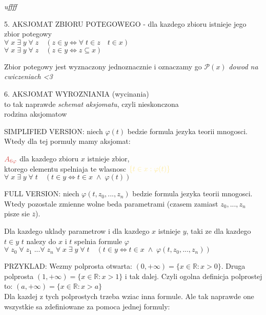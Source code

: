 \documentclass{article}
\newcommand{\R}{\mathbb{R}}
\newcommand{\Po}{\mathcal{P}}
\begin{document}
  \emph{uffff}\bigskip
  \begin{center}
    \color{tit}5. AKSJOMAT ZBIORU POTEGOWEGO \color{txt}- dla kazdego zbioru istnieje jego zbior potegowy\smallskip\\
    $\forall\;x\;\exists\;y\;\forall\;z\quad (z\in y\iff\forall\;t\in z\quad t\in x)$\smallskip\\
    $\forall\;x\;\exists\;y\;\forall\;z\quad (z\in y\iff z\subseteq x)$
  \end{center}
  Zbior potegowy jest wyznaczony jednoznacznie i oznaczamy go $\Po(x)$ \emph{\color{emp}dowod na cwiczeniach <3}\bigskip
  \begin{center}
    \color{tit}6. AKSJOMAT WYROZNIANIA \color{txt}(wycinania)\smallskip\\
    to tak naprawde \emph{\color{acc}schemat aksjomatu}, czyli nieskonczona \\
    rodzina aksjomatow
  \end{center}
  \color{def}SIMPLIFIED VERSION: \color{txt}niech $\varphi(t)$ bedzie formula jezyka teorii mnogosci. Wtedy dla tej pormuly mamy aksjomat:
  \begin{center}
    $\color{tit}A_{6\varphi}$ dla kazdego zbioru $x$ istnieje zbior, \\
    ktorego elementu spelniaja te wlasnosc $\color{acc}\{t\in x:\varphi(t)\}$\smallskip\\
    $\forall\;x\;\exists\;y\;\forall\;t\quad(t\in y\iff t\in x\;\land\;\varphi(t))$
  \end{center}\bigskip
  \color{def}FULL VERSION: \color{txt}niech $\varphi(t, z_0, ..., z_n)$ bedzie formula jezyka teorii mnogosci. Wtedy pozostale zmienne wolne beda parametrami (czasem zamiast $z_0, ..., z_n$ pisze sie $\overline{z}$).
  \begin{center}
    Dla kazdego uklady parametrow i dla kazdego $x$ istnieje $y$, taki ze dla kazdego $t\in y$ $t$ nalezy do $x$ i $t$ spelnia formule $\varphi$\smallskip\\
    $\forall\;z_0\;\forall\;z_1\;...\forall\;z_n\;\forall\;x\;\exists\;y\;\forall\;t\quad(t\in y\iff t\in x\;\land\;\varphi(t,z_0,...,z_n))$
  \end{center}\bigskip
  \color{acc}PRZYKLAD: \color{txt}Wezmy polprosta otwarta: $(0, +\infty)=\{x\in\R:x>0\}.$ Druga polprosta $(1, +\infty)=\{x\in\R:x>1\}$ i tak dalej. Czyli ogolna definicja polprostej to:
  $(a, +\infty)=\{x\in\R:x>a\}$\\
  Dla kazdej z tych polprostych trzeba wziac inna formule. Ale tak naprawde one wszystkie sa zdefiniowane za pomoca jednej formuly:
\end{document}

